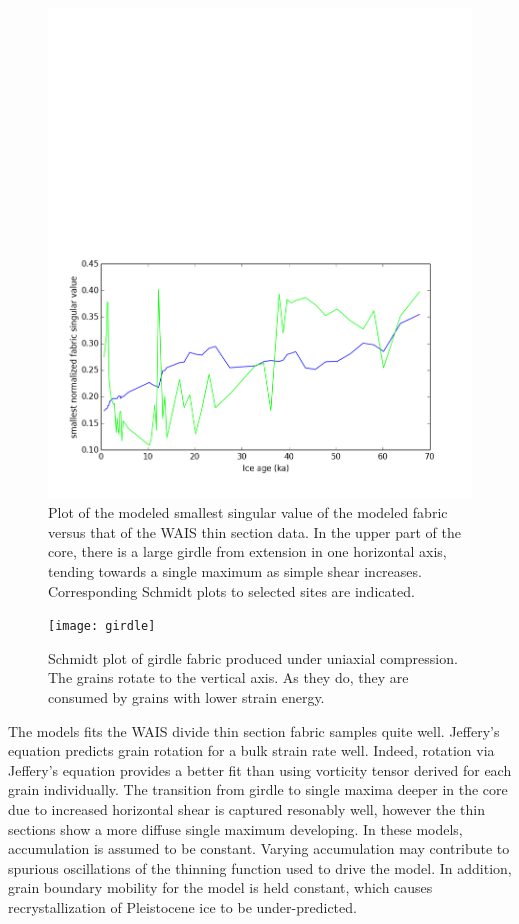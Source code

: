 \documentclass{article}
\begin{document}
\begin{figure}
\caption{Plot of the modeled smallest  singular value of the modeled fabric versus that of the WAIS thin section data. In the upper part of the core, there is a large girdle from extension in one horizontal axis, tending towards a single maximum as simple shear increases. Corresponding Schmidt plots to selected sites are indicated.}
\includegraphics[width=12cm]{waisfit}
\end{figure}
\begin{figure}
\caption{Schmidt plot of girdle fabric produced under uniaxial compression. The grains rotate to the vertical axis. As they do, they are consumed by grains with lower strain energy.} 
\texttt{[image: girdle]}
\end{figure}

The models fits the WAIS divide thin section fabric samples quite well. Jeffery's equation predicts grain rotation for a bulk strain rate well. Indeed, rotation via Jeffery's equation provides a better fit than using vorticity tensor derived for each grain individually. The transition from girdle to single maxima deeper in the core due to increased horizontal shear is captured resonably well, however the thin sections show a more diffuse single maximum developing. In these models, accumulation is assumed to be constant. Varying accumulation may contribute to spurious oscillations of the thinning function used to drive the model. In addition, grain boundary mobility for the model is held constant, which causes recrystallization of Pleistocene ice to be under-predicted.  
\end{document}
